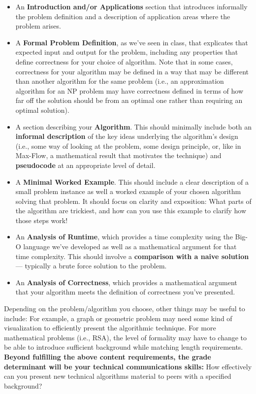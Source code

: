 \documentclass{article}
\begin{document}
\begin{itemize}
    \item An \textbf{Introduction and/or Applications} section that introduces informally the problem definition and a description of application areas where the problem arises. 
    \item A \textbf{Formal Problem Definition}, as we've seen in class, that explicates that expected input and output for the problem, including any properties that define correctness for your choice of algorithm. Note that in some cases, correctness for your algorithm may be defined in a way that may be different than another algorithm for the same problem (i.e., an approximation algorithm for an NP problem may have correctness defined in terms of how far off the solution should be from an optimal one rather than requiring an optimal solution). 
    \item A section describing your \textbf{Algorithm}. This should minimally include both an \textbf{informal description} of the key ideas underlying the algorithm's design (i.e., some way of looking at the problem, some design principle, or, like in Max-Flow, a mathematical result that motivates the technique) and \textbf{pseudocode} at an appropriate level of detail. 
    \item A \textbf{Minimal Worked Example}. This should include a clear description of a small problem instance as well a worked example of your chosen algorithm solving that problem. It should focus on clarity and exposition: What parts of the algorithm are trickiest, and how can you use this example to clarify how those steps work!
    \item An \textbf{Analysis of Runtime}, which provides a time complexity using the Big-O language we've developed as well as a mathematical argument for that time complexity. This should involve a \textbf{comparison with a naive solution} --- typically a brute force solution to the problem.
    \item An \textbf{Analysis of Correctness}, which provides a mathematical argument that your algorithm meets the definition of correctness you've presented.
\end{itemize}

Depending on the problem/algorithm you choose, other things may be useful to include: For example, a graph or geometric problem may need some kind of visualization to efficiently present the algorithmic technique. For more mathematical problems (i.e., RSA), the level of formality may have to change to be able to introduce sufficient background while matching length requirements. \textbf{Beyond fulfilling the above content requirements, the grade determinant will be your technical communications skills:} How effectively can you present new technical algorithms material to peers with a specified background? 
\end{document}
